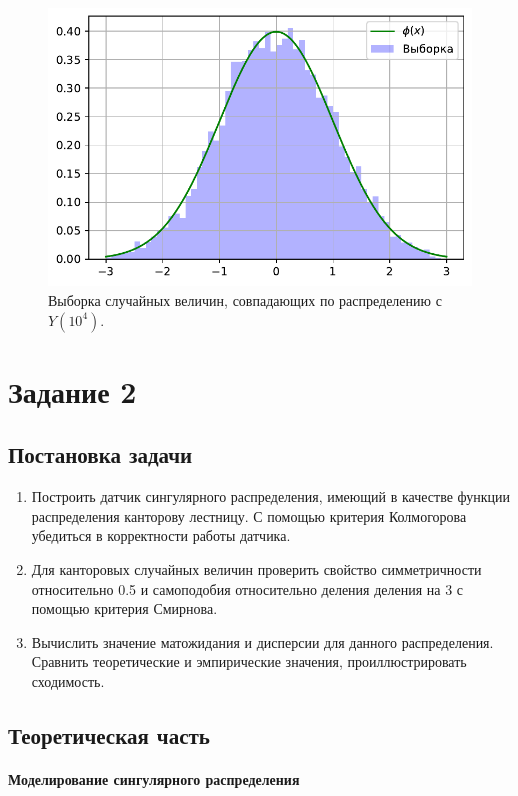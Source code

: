 \documentclass[16pt]{article}
\begin{document}
\begin{figure}[h]
	\center
    \includegraphics[scale=0.7]{1_5.pdf}
    \caption{Выборка случайных величин, совпадающих по распределению с $Y(10^4)$.}
\end{figure}

\section{Задание 2}
\subsection{Постановка задачи}
\begin{enumerate}
\item Построить датчик сингулярного распределения, имеющий в качестве функции распределения канторову лестницу. С помощью критерия Колмогорова убедиться в корректности работы датчика.
\item Для канторовых случайных величин проверить свойство симметричности относительно 0.5 и самоподобия относительно деления деления на 3 с помощью критерия Смирнова.
\item Вычислить значение матожидания и дисперсии для данного распределения. Сравнить теоретические и эмпирические значения, проиллюстрировать сходимость.
\end{enumerate}

\subsection{Теоретическая часть}

\paragraph{Моделирование сингулярного распределения}
\end{document}
